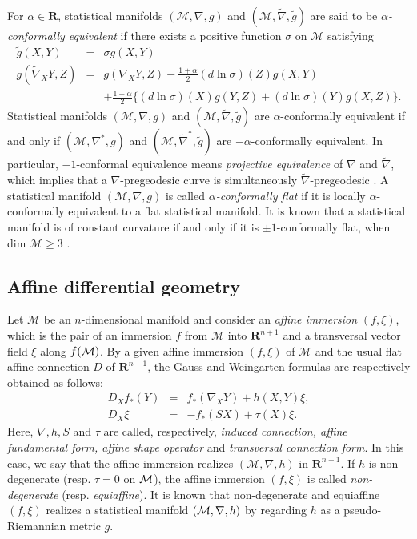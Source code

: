 \documentclass{llncs}
\begin{document}
For $\alpha \in \mathbf{R}$, statistical manifolds 
$(\mathcal{M},\nabla,g)$ and $(\mathcal{M},\tilde \nabla ,\tilde g)$ 
are said to be
{\em $\alpha$-conformally equivalent} \cite{Kurose94}
if there exists a positive function $\sigma$ on $\mathcal{M}$ satisfying
\begin{eqnarray*}
  \tilde g(X,Y)&=&\sigma g(X,Y) 
\label{conf_eq1} \\
 g( \tilde \nabla_X Y,Z)&=&g(\nabla_X Y,Z)
	-\frac{1+\alpha}{2}(d \ln \sigma)(Z)g(X,Y) \nonumber \\
 && +\frac{1-\alpha}{2}\{(d\ln \sigma)(X)g(Y,Z)+(d\ln \sigma)(Y)g(X,Z)\}.
\label{conf_eq2}
\end{eqnarray*}
Statistical manifolds $(\mathcal{M},\nabla,g)$ and 
$(\mathcal{M},\tilde \nabla, \tilde g)$ are $\alpha$-conformally
equivalent if and only if $(\mathcal{M},\nabla^*,g)$ and 
$(\mathcal{M},{\tilde \nabla}^*,\tilde g)$ are 
$-\alpha$-conformally equivalent.
In particular, $-1$-conformal equivalence means 
{\em projective equivalence} of $\nabla$ and $\tilde \nabla$, 
which implies that a $\nabla$-pregeodesic curve is 
simultaneously $\tilde \nabla$-pregeodesic \cite{NS}.
A statistical manifold $(\mathcal{M},\nabla,g)$ is called
{\em $\alpha$-conformally flat} if it is locally
$\alpha$-conformally equivalent to a flat statistical manifold.
It is known that a statistical manifold is of constant curvature 
if and only if it is $\pm 1$-conformally flat,
when dim $\mathcal{M} \ge 3$ \cite{Kurose94}.

\subsection{Affine differential geometry}
Let $\mathcal{M}$ be an $n$-dimensional manifold and consider 
an {\em affine immersion} \cite{NS} $(f,\xi)$, which is the pair of 
an immersion $f$ from $\mathcal{M}$ into $\mathbf{R}^{n+1}$ and a
transversal vector field $\xi$ along $f({\cal M})$. 
By a given affine immersion $(f,\xi)$ of $\mathcal{M}$ and the usual
flat affine connection $D$ of $\mathbf{R}^{n+1}$, the Gauss and Weingarten
formulas are respectively obtained as follows:
\begin{eqnarray*}
 D_Xf_*(Y) &=& f_*(\nabla_X Y) + h(X,Y)\xi, \\
 D_X \xi &=&- f_*(SX) + \tau(X) \xi.
\end{eqnarray*}
Here, $\nabla, h, S$ and $\tau$ are called, respectively, 
{\em induced connection, affine fundamental form, affine shape operator} 
and {\em transversal connection form}.
In this case, we say that the affine immersion realizes
$(\mathcal{M},\nabla,h)$ in $\mathbf{R}^{n+1}$.
If $h$ is non-degenerate (resp. $\tau=0$ on ${\cal M}$), 
the affine immersion $(f, \xi)$ is called 
{\em non-degenerate} (resp. {\em equiaffine}).
It is known that non-degenerate and equiaffine $(f,\xi)$ realizes  
a statistical manifold $({\cal M},\nabla,h)$ by regarding 
$h$ as a pseudo-Riemannian metric $g$.
\end{document}
